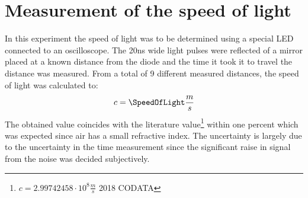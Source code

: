 \documentclass[a4paper,10pt,twocolumn]{article}
\begin{document}
    \section{Measurement of the speed of light}
    \label{sec:speedOfLightMeasurement}
    In this experiment the speed of light was to be determined using a special LED connected to an oscilloscope.
    The 20ns wide light pulses were reflected of a mirror placed at a known distance from the diode and the time it took it to travel the distance was measured.
    From a total of 9 different measured distances, the speed of light was calculated to:
    \begin{align}
        c = \SpeedOfLight \frac{m}{s}
    \end{align}
    The obtained value coincides with the literature value\footnote{$c=2.99742458\cdot10^8 \frac{m}{s} $ 2018 CODATA} within one percent which was expected since air has a small refractive index.
    The uncertainty is largely due to the uncertainty in the time measurement since the significant raise in signal from the noise was decided subjectively.
    
\end{document}
